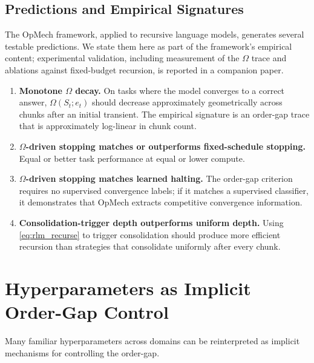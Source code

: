 \documentclass[12pt,a4paper]{article}
\newcommand{\Ogap}{\Omega}
\begin{document}
\subsection{Predictions and Empirical Signatures}

The OpMech framework, applied to recursive language models, generates several
testable predictions. We state them here as part of the framework's
empirical content; experimental validation, including measurement of the
$\Ogap$ trace and ablations against fixed-budget recursion, is reported in
a companion paper.

\begin{enumerate}
\item \textbf{Monotone $\Ogap$ decay.} On tasks where the model converges to
      a correct answer, $\Ogap(S_t; e_t)$ should decrease approximately
      geometrically across chunks after an initial transient. The empirical
      signature is an order-gap trace that is approximately log-linear in
      chunk count.

\item \textbf{$\Ogap$-driven stopping matches or outperforms fixed-schedule
      stopping.} Equal or better task performance at equal or lower compute.

\item \textbf{$\Ogap$-driven stopping matches learned halting.} The order-gap
      criterion requires no supervised convergence labels; if it matches a
      supervised classifier, it demonstrates that OpMech extracts competitive
      convergence information.

\item \textbf{Consolidation-trigger depth outperforms uniform depth.}
      Using \eqref{eq:rlm_recurse} to trigger consolidation should produce
      more efficient recursion than strategies that consolidate uniformly after every chunk.
\end{enumerate}

\section{Hyperparameters as Implicit Order-Gap Control}
\label{sec:hyperparams}

Many familiar hyperparameters across domains can be reinterpreted as implicit
mechanisms for controlling the order-gap.
\end{document}
